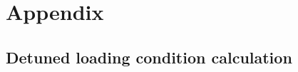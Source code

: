 
{\chapter{Appendix}\label{chap:appendix}}   %

\setcounter{figure}{0}

\section{Detuned loading condition calculation}\label{sec:detuned_loading_cal}

